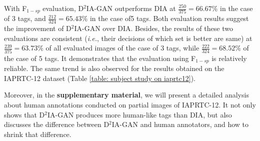 \documentclass[10pt,twocolumn,letterpaper]{article}
\begin{document}
With F$_{1-sp}$ evaluation, D$^2$IA-GAN outperforms DIA at $\frac{250}{375}=66.67\%$ in the case of 3 tags, and $\frac{212}{324}=65.43\%$ in the case of5 tags. 
Both evaluation results suggest the improvement of D$^2$IA-GAN over DIA. 
Besides, the results of these two evaluations are consistent ({\it i.e.}, their decisions of which set is better are same) at $\frac{239}{375}=63.73\%$ of all evaluated images of the case of 3 tags, while $\frac{222}{324}=68.52\%$ of the case of 5 tags. 
It demonstrates that the evaluation using F$_{1-sp}$ is relatively reliable. 
%
The same trend is also observed for the results obtained on the IAPRTC-12 dataset (Table \ref{table: subject study on iaprtc12}). 

Moreover, in the {\bf supplementary material}, we will present a detailed analysis about human annotations conducted on partial images of IAPRTC-12. 
It not only shows that D$^2$IA-GAN produces more human-like tags than DIA, but also discusses the difference between D$^2$IA-GAN and human annotators, and how to shrink that difference.
\end{document}
